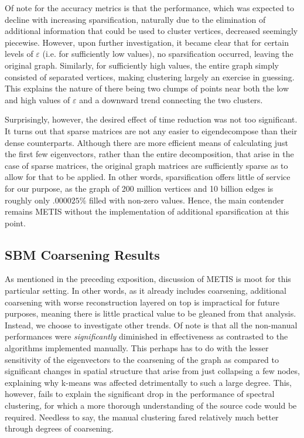 \documentclass{article}
\begin{document}
Of note for the accuracy metrics is that the performance, which was expected to decline with increasing sparsification, naturally due to the elimination of additional information that could be used to cluster vertices, decreased seemingly piecewise. However, upon further investigation, it became clear that for certain levels of $\varepsilon$ (i.e. for sufficiently low values), no sparsification occurred, leaving the original graph. Similarly, for sufficiently high values, the entire graph simply consisted of separated vertices, making clustering largely an exercise in guessing. This explains the nature of there being two clumps of points near both the low and high values of $\varepsilon$ and a downward trend connecting the two clusters.

Surprisingly, however, the desired effect of time reduction was not too significant. It turns out that sparse matrices are not any easier to eigendecompose than their dense counterparts. Although there are more efficient means of calculating just the first few eigenvectors, rather than the entire decomposition, that arise in the case of sparse matrices, the original graph matrices are sufficiently sparse as to allow for that to be applied. In other words, sparsification offers little of service for our purpose, as the graph of 200 million vertices and 10 billion edges is roughly only $.000025\%$ filled with non-zero values. Hence, the main contender remains METIS without the implementation of additional sparsification at this point.

\subsection{SBM Coarsening Results}
As mentioned in the preceding exposition, discussion of METIS is moot for this particular setting. In other words, as it already includes coarsening, additional coarsening with worse reconstruction layered on top is impractical for future purposes, meaning there is little practical value to be gleaned from that analysis. Instead, we choose to investigate other trends. Of note is that all the non-manual performances were \textit{significantly} diminished in effectiveness as contrasted to the algorithms implemented manually. This perhaps has to do with the lesser sensitivity of the eigenvectors to the coarsening of the graph as compared to significant changes in spatial structure that arise from just collapsing a few nodes, explaining why k-means was affected detrimentally to such a large degree. This, however, fails to explain the significant drop in the performance of spectral clustering, for which a more thorough understanding of the source code would be required. Needless to say, the manual clustering fared relatively much better through degrees of coarsening.
\end{document}
